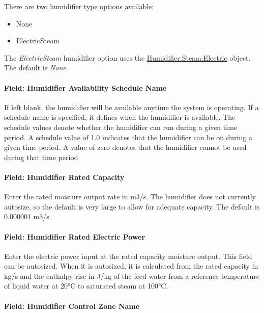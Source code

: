 There are two humidifier type options available:

\begin{itemize}
\item
  None
\item
  ElectricSteam
\end{itemize}

The \emph{ElectricSteam} humidifier option uses the \hyperref[humidifiersteamelectric]{Humidifier:Steam:Electric} object. The default is \emph{None.}

\paragraph{Field: Humidifier Availability Schedule Name}\label{field-humidifier-availability-schedule-name-6}

If left blank, the humidifier will be available anytime the system is operating. If a schedule name is specified, it defines when the humidifier is available. The schedule values denote whether the humidifier can run during a given time period. A schedule value of 1.0 indicates that the humidifier can be on during a given time period. A value of zero denotes that the humidifier cannot be used during that time period

\paragraph{Field: Humidifier Rated Capacity}\label{field-humidifier-rated-capacity-6}

Enter the rated moisture output rate in m3/s. The humidifier does not currently autosize, so the default is very large to allow for adequate capacity. The default is 0.000001 m3/s.

\paragraph{Field: Humidifier Rated Electric Power}\label{field-humidifier-rated-electric-power-6}

Enter the electric power input at the rated capacity moisture output. This field can be autosized. When it is autosized, it is calculated from the rated capacity in kg/s and the enthalpy rise in J/kg of the feed water from a reference temperature of liquid water at 20°C to saturated steam at 100°C.

\paragraph{Field: Humidifier Control Zone Name}\label{field-humidifier-control-zone-name-6}

